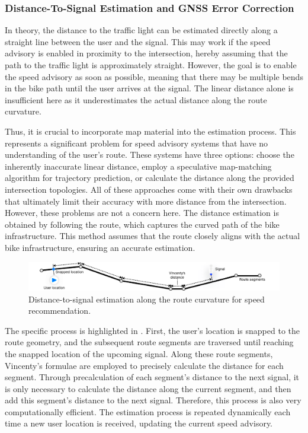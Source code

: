 \subsubsection{Distance-To-Signal Estimation and GNSS Error Correction}

In theory, the distance to the traffic light can be estimated directly along a straight line between the user and the signal. This may work if the speed advisory is enabled in proximity to the intersection, hereby assuming that the path to the traffic light is approximately straight. However, the goal is to enable the speed advisory as soon as possible, meaning that there may be multiple bends in the bike path until the user arrives at the signal. The linear distance alone is insufficient here as it underestimates the actual distance along the route curvature. 

Thus, it is crucial to incorporate map material into the estimation process. This represents a significant problem for speed advisory systems that have no understanding of the user's route. These systems have three options: choose the inherently inaccurate linear distance, employ a speculative map-matching algorithm for trajectory prediction, or calculate the distance along the provided intersection topologies. All of these approaches come with their own drawbacks that ultimately limit their accuracy with more distance from the intersection. However, these problems are not a concern here. The distance estimation is obtained by following the route, which captures the curved path of the bike infrastructure. This method assumes that the route closely aligns with the actual bike infrastructure, ensuring an accurate estimation.

\begin{figure}[htbp]
\centering
\includegraphics[width=\linewidth]{images/distance-to-signal-estimation.pdf}
\caption{Distance-to-signal estimation along the route curvature for speed recommendation.}
\label{fig:distance-to-signal-estimation}
\end{figure}

The specific process is highlighted in . First, the user's location is snapped to the route geometry, and the subsequent route segments are traversed until reaching the snapped location of the upcoming signal. Along these route segments, Vincenty's formulae are employed to precisely calculate the distance for each segment. Through precalculation of each segment's distance to the next signal, it is only necessary to calculate the distance along the current segment, and then add this segment's distance to the next signal. Therefore, this process is also very computationally efficient. The estimation process is repeated dynamically each time a new user location is received, updating the current speed advisory.


